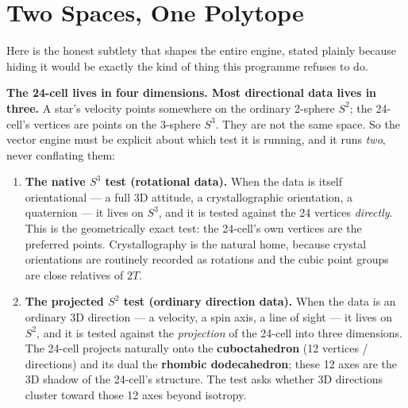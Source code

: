\documentclass[11pt, letterpaper, openany]{book}
\begin{document}
\section{Two Spaces, One Polytope}

Here is the honest subtlety that shapes the entire engine, stated plainly because hiding it would be
exactly the kind of thing this programme refuses to do.

\begin{correctionbox}
\textbf{The 24-cell lives in four dimensions. Most directional data lives in three.} A star's velocity
points somewhere on the ordinary 2-sphere $S^2$; the 24-cell's vertices are points on the 3-sphere
$S^3$. They are not the same space. So the vector engine must be explicit about which test it is
running, and it runs \emph{two}, never conflating them:
\end{correctionbox}

\begin{enumerate}
\item \textbf{The native $S^3$ test (rotational data).} When the data is itself orientational --- a full
3D attitude, a crystallographic orientation, a quaternion --- it lives on $S^3$, and it is tested
against the 24 vertices \emph{directly}. This is the geometrically exact test: the 24-cell's own
vertices are the preferred points. Crystallography is the natural home, because crystal orientations
are routinely recorded as rotations and the cubic point groups are close relatives of $2T$.

\item \textbf{The projected $S^2$ test (ordinary direction data).} When the data is an ordinary 3D
direction --- a velocity, a spin axis, a line of sight --- it lives on $S^2$, and it is tested against
the \emph{projection} of the 24-cell into three dimensions. The 24-cell projects naturally onto the
\textbf{cuboctahedron} (12 vertices / directions) and its dual the \textbf{rhombic dodecahedron}; these
12 axes are the 3D shadow of the 24-cell's structure. The test asks whether 3D directions cluster
toward those 12 axes beyond isotropy.
\end{enumerate}
\end{document}
